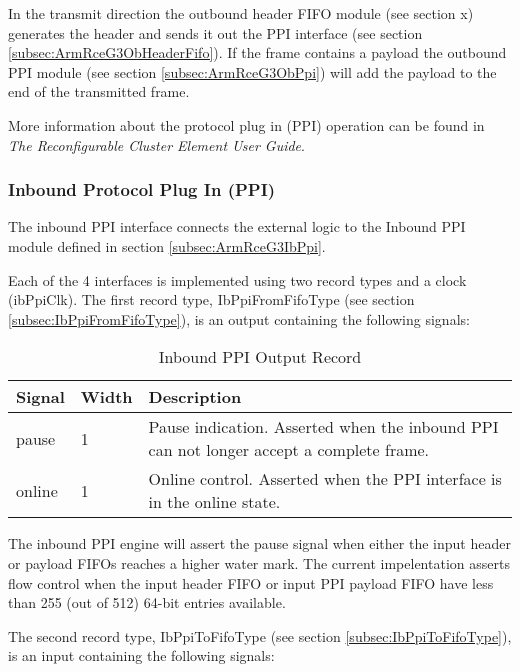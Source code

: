 \documentclass[11pt]{article}
\begin{document}
In the transmit direction the outbound header FIFO module (see section x) generates the header and sends it out the PPI interface 
(see section \ref{subsec:ArmRceG3ObHeaderFifo}). If the frame contains a payload the outbound PPI module 
(see section \ref{subsec:ArmRceG3ObPpi}) will add the payload to the end of the transmitted frame.

More information about the protocol plug in (PPI) operation can be found in \textit{The Reconfigurable Cluster Element User Guide}.

\subsubsection{Inbound Protocol Plug In (PPI)}
\label{subsubsec:external_ib_ppi}

The inbound PPI interface connects the external logic to the Inbound PPI module defined in section \ref{subsec:ArmRceG3IbPpi}.

Each of the 4 interfaces is implemented using two record types and a clock (ibPpiClk). The first record type, IbPpiFromFifoType (see section \ref{subsec:IbPpiFromFifoType}), 
is an output containing the following signals:

\begin{table}[H]
\small
\centering
   \begin{tabular}{| l | l | l | }
      \hline \textbf{Signal} & \textbf{Width}  & \textbf{Description} \\
      \hline pause  & 1  & Pause indication. Asserted when the inbound PPI can not longer accept a complete frame. \\
      \hline online & 1  & Online control. Asserted when the PPI interface is in the online state. \\
      \hline
   \end{tabular}
   \caption{Inbound PPI Output Record}
\end{table}

The inbound PPI engine will assert the pause signal when either the input header or payload FIFOs reaches a higher water mark. 
The current impelentation asserts flow control when the input header FIFO or input PPI payload FIFO have less than 255 (out of 512) 
64-bit entries available.

The second record type, IbPpiToFifoType (see section \ref{subsec:IbPpiToFifoType}), is an input containing the following signals:
\end{document}
